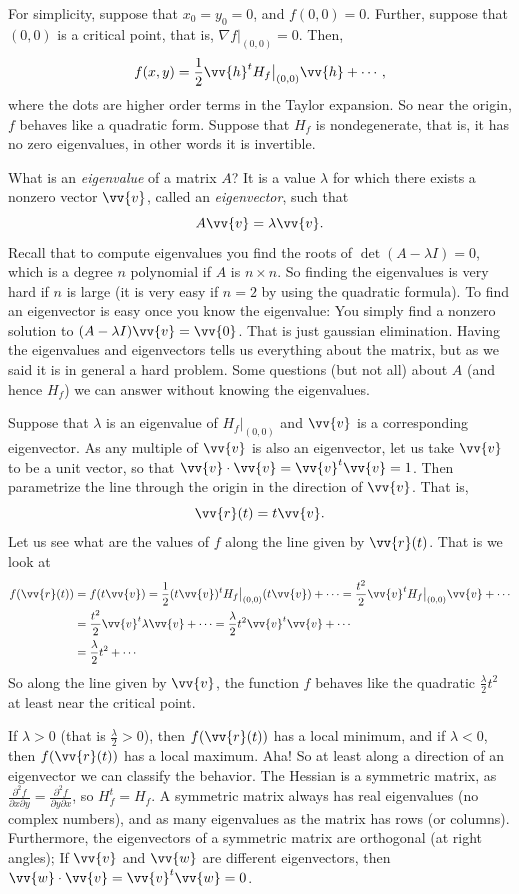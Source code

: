 \documentclass[12pt]{article}
\begin{document}
For simplicity, suppose that $x_0 = y_0 = 0$, and $f(0,0) = 0$.
Further, suppose that $(0,0)$ is a critical point, that is,
$\nabla f|_{(0,0)} = 0$.  Then,
\[
f(x,y) = \frac{1}{2} \vv{h}^{t} H_f\big|_{(0,0)} \vv{h}
+
\cdots ,
\]
where the dots are higher order terms in the Taylor expansion.
So near the origin, $f$ behaves like a quadratic form.
Suppose that $H_f$ is nondegenerate, that is, it has
no zero eigenvalues, in other words it is invertible.

What is an \emph{eigenvalue} of a matrix $A$?
It is a value $\lambda$ for which there exists
a nonzero vector $\vv{v}$, called an \emph{eigenvector}, such that
\[
A \vv{v} = \lambda \vv{v} .
\]
Recall that to compute eigenvalues you find the roots of $\det(A-\lambda I)
= 0$, which is a degree $n$ polynomial if $A$ is $n \times n$.  So finding
the eigenvalues is very hard if $n$ is large (it is very easy if $n=2$ by
using the quadratic formula).  To find an eigenvector is easy once you know
the eigenvalue: You simply find a nonzero solution to $(A-\lambda I) \vv{v}
= \vv{0}$.  That is just gaussian elimination.  Having the eigenvalues
and eigenvectors tells us everything about the matrix, but as we said
it is in general a hard problem.  Some questions (but not all)
about $A$ (and hence $H_f$) we can answer without knowing the eigenvalues.

Suppose that $\lambda$ is an eigenvalue of $H_f\big|_{(0,0)}$ and $\vv{v}$ is a
corresponding eigenvector.  As any multiple of $\vv{v}$ is also an
eigenvector, let us take $\vv{v}$ to be a unit vector,
so that $\vv{v} \cdot \vv{v} = \vv{v}^t \vv{v} = 1$.
Then parametrize the line through the origin in the direction
of $\vv{v}$.  That is,
\[
\vv{r}(t) = t\vv{v} .
\]
Let us see what are the values of $f$ along the line given by
$\vv{r}(t)$.  That is we look at
\[
\begin{split}
f(\vv{r}(t)) & = 
f(t \vv{v}) = 
\frac{1}{2} (t \vv{v})^{t} H_f\big|_{(0,0)} (t \vv{v})
+
\cdots 
=
\frac{t^2}{2} \vv{v}^{t} H_f\big|_{(0,0)} \vv{v}
+
\cdots 
\\
& =
\frac{t^2}{2} \vv{v}^{t} \lambda \vv{v}
+
\cdots 
=
\frac{\lambda}{2} t^2 \vv{v}^{t} \vv{v}
+
\cdots 
\\
& =
\frac{\lambda}{2} t^2
+
\cdots 
\end{split}
\]
So along the line given by $\vv{v}$, the function $f$ behaves like
the quadratic $\frac{\lambda}{2} t^2$ at least near the critical point.

If $\lambda > 0$ (that is $\frac{\lambda}{2} > 0$), then
$f(\vv{r}(t))$ has a local minimum, and if 
$\lambda < 0$, then
$f(\vv{r}(t))$ has a local maximum.  Aha!  So at least along a direction of
an eigenvector we can classify the behavior.
The Hessian is a
symmetric matrix, as
$\frac{\partial^2 f}{\partial x \partial y} = 
\frac{\partial^2 f}{\partial y \partial x}$, so $H_f^t = H_f$.  A symmetric
matrix always has real eigenvalues (no complex numbers),
and as many eigenvalues as the matrix has rows (or columns).
Furthermore,
the eigenvectors of a symmetric matrix are orthogonal (at right angles);
If $\vv{v}$ and
$\vv{w}$ are different eigenvectors, then
$\vv{w} \cdot \vv{v} = \vv{v}^t \vv{w} = 0$.
\end{document}
